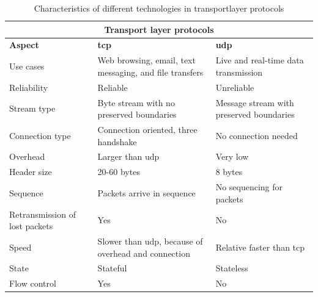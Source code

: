 \begin{table}[htbp]
\small
\centering
\caption{Characteristics of different technologies in transportlayer protocols}
\label{tab: transportlayer}
\begin{tabular}{|m{}|m{}|m{}|}
\hline
\multicolumn{3}{|c|}{\textbf{Transport layer protocols}}                                                            \\ \hline
\textbf{Aspect}                         & \textbf{\gls{tcp}}             & \textbf{\gls{udp}}        \\ \hline
Use cases                      & Web browsing, email, text messaging, and file transfers & Live and real-time data transmission \\ \hline
Reliability                    & Reliable        & Unreliable \\ \hline
Stream type                    & Byte stream with no preserved boundaries & Message stream with preserved boundaries \\ \hline
Connection type                & Connection oriented, three handshake & No connection needed \\ \hline
Overhead                       & Larger than \gls{udp} & Very low   \\ \hline
Header size                    & 20-60 bytes     & 8 bytes    \\ \hline
Sequence                       & Packets arrive in sequence & No sequencing for packets \\ \hline
Retransmission of lost packets & Yes             & No         \\ \hline
Speed                          & Slower than \gls{udp}, because of overhead and connection & Relative faster than \gls{tcp} \\ \hline
State                          & Stateful        & Stateless  \\ \hline
Flow control                   & Yes             & No         \\ \hline
\end{tabular}
\end{table}





